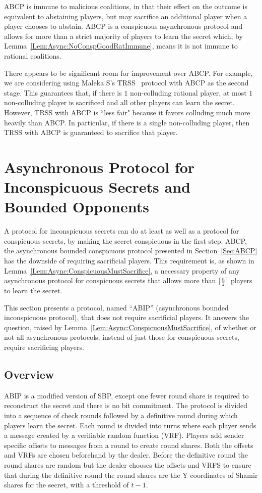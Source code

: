 \documentclass[12pt]{dalcsthesis}
\begin{document}
ABCP is immune to malicious coalitions, in that their effect on the outcome is equivalent to abstaining players, but may sacrifice an additional player when a player chooses to abstain. ABCP is a conspicuous asynchronous protocol and allows for more than a strict majority of players to learn the secret which, by Lemma~\ref{Lem:Async:NoConspGoodRatImmune}, means it is not immune to rational coalitions.

There appears to be significant room for improvement over ABCP. For example, we are considering using Maleka S's TRSS~\cite{MalekaS_08} protocol with ABCP as the second stage. This guarantees that, if there is $1$ non-colluding rational player, at most $1$ non-colluding player is sacrificed and all other players can learn the secret. However, TRSS with ABCP is ``less fair" because it favors colluding much more heavily than ABCP. In particular, if there is a single non-colluding player, then TRSS with ABCP is guaranteed to sacrifice that player.



\section{Asynchronous Protocol for Inconspicuous Secrets and Bounded Opponents}
\label{Sec:ABIP}

A protocol for inconspicuous secrets can do at least as well as a protocol for conspicuous secrets, by making the secret conspicuous in the first step. ABCP, the asynchronous bounded conspicuous protocol presented in Section~\ref{Sec:ABCP} has the downside of requiring sacrificial players. This requirement is, as shown in Lemma~\ref{Lem:Async:ConspicuousMustSacrifice}, a necessary property of any asynchronous protocol for conspicuous secrets that allows more than $\lceil \frac{n}{2} \rceil$ players to learn the secret.

This section presents a protocol, named ``ABIP'' (asynchronous bounded inconspicuous protocol), that does not require sacrificial players. It answers the question, raised by Lemma~\ref{Lem:Async:ConspicuousMustSacrifice}, of whether or not all asynchronous protocols, instead of just those for conspicuous secrets, require sacrificing players.


\subsection{Overview}

ABIP is a modified version of SBP, except one fewer round share is required to reconstruct the secret and there is no bit commitment. The protocol is divided into a sequence of check rounds followed by a definitive round during which players learn the secret. Each round is divided into turns where each player sends a message created by a verifiable random function (VRF). Players add sender specific offsets to messages from a round to create round shares. Both the offsets and VRFs are chosen beforehand by the dealer. Before the definitive round the round shares are random but the dealer chooses the offsets and VRFS to ensure that during the definitive round the round shares are the Y coordinates of Shamir shares for the secret, with a threshold of $t-1$.
\end{document}
